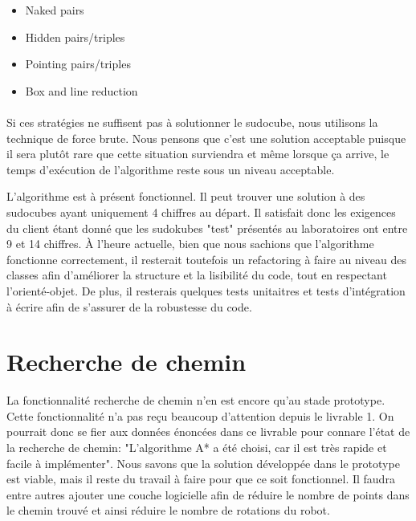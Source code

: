 \begin{itemize}
\item Naked pairs
\item Hidden pairs/triples
\item Pointing pairs/triples
\item Box and line reduction
\end{itemize}

\paragraph{}Si ces stratégies ne suffisent pas à solutionner le sudocube, nous utilisons la technique de force brute. Nous pensons que c'est une solution acceptable puisque il sera plutôt rare que cette situation surviendra et même lorsque ça arrive, le temps d'exécution de l'algorithme reste sous un niveau acceptable.

L'algorithme est à présent fonctionnel. Il peut trouver une solution à des sudocubes ayant uniquement 4 chiffres au départ. Il satisfait donc les exigences du client étant donné que les sudokubes "test" présentés au laboratoires ont entre 9 et 14 chiffres. À l'heure actuelle, bien que nous sachions que l'algorithme fonctionne correctement, il resterait toutefois un refactoring à faire au niveau des classes afin d'améliorer la structure et la lisibilité du code, tout en respectant l'orienté-objet. De plus, il resterais quelques tests unitaitres et tests d'intégration à écrire afin de s'assurer de la robustesse du code.

\section{Recherche de chemin}
La fonctionnalité recherche de chemin n’en est encore qu’au stade prototype. Cette fonctionnalité n'a pas reçu beaucoup d'attention depuis le livrable 1. On pourrait donc se fier aux données énoncées dans ce livrable pour connare l'état de la recherche de chemin: "L'algorithme A* a été choisi, car il est très rapide et facile à implémenter". Nous savons que la solution développée dans le prototype est viable, mais il reste du travail à faire pour que ce soit fonctionnel. Il faudra entre autres ajouter une couche logicielle afin de réduire le nombre de points dans le chemin trouvé et ainsi réduire le nombre de rotations du robot.


















